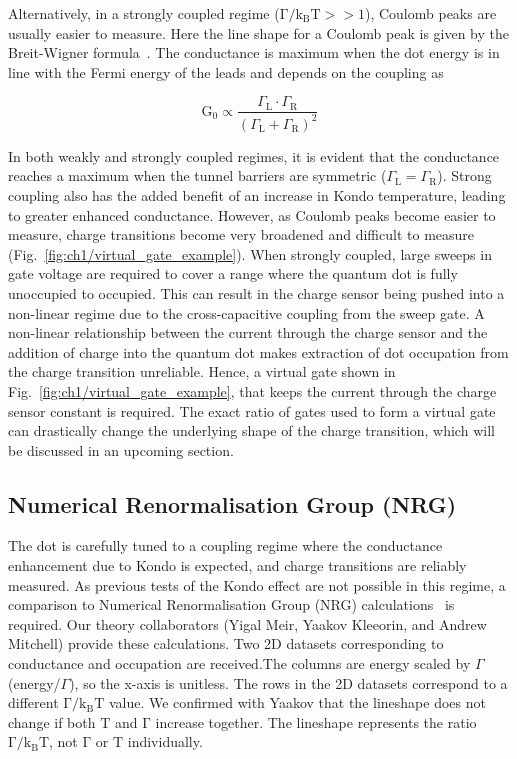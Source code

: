 Alternatively, in a strongly coupled regime ($\mathrm{\Gamma/k_BT}>>1$), Coulomb peaks are usually easier to measure. Here the line shape for a Coulomb peak is given by the Breit-Wigner formula~\cite{Breit1936}. The conductance is maximum when the dot energy is in line with the Fermi energy of the leads and depends on the coupling as 

\begin{equation}\label{eq:cond_amp_strong}
 \mathrm{G_0} \propto
 \frac{\Gamma_\mathrm{L}\cdot\Gamma_\mathrm{R}}{\left(\Gamma_\mathrm{L}+\Gamma_\mathrm{R}\right)^2}
\end{equation}

\noindent In both weakly and strongly coupled regimes, it is evident that the conductance reaches a maximum when the tunnel barriers are symmetric ($\Gamma_\mathrm{L}=\Gamma_\mathrm{R}$). Strong coupling also has the added benefit of an increase in Kondo temperature, leading to greater enhanced conductance. 
However, as Coulomb peaks become easier to measure, charge transitions become very broadened and difficult to measure (Fig.~\ref{fig:ch1/virtual_gate_example}). When strongly coupled, large sweeps in gate voltage are required to cover a range where the quantum dot is fully unoccupied to occupied. This can result in the charge sensor being pushed into a non-linear regime due to the cross-capacitive coupling from the sweep gate.
A non-linear relationship between the current through the charge sensor and the addition of charge into the quantum dot makes extraction of dot occupation from the charge transition unreliable. Hence, a virtual gate shown in Fig.~\ref{fig:ch1/virtual_gate_example}, that keeps the current through the charge sensor constant is required. The exact ratio of gates used to form a virtual gate can drastically change the underlying shape of the charge transition, which will be discussed in an upcoming section. 


\subsection{Numerical Renormalisation Group (NRG)}
The dot is carefully tuned to a coupling regime where the conductance enhancement due to Kondo is expected, and charge transitions are reliably measured. As previous tests of the Kondo effect are not possible in this regime, a comparison to Numerical Renormalisation Group (NRG) calculations~\cite{nrg} is required. Our theory collaborators (Yigal Meir, Yaakov Kleeorin, and Andrew Mitchell) provide these calculations. 
Two 2D datasets corresponding to conductance and occupation are received.The columns are energy scaled by $\Gamma$ (energy/$\Gamma$), so the x-axis is unitless. The rows in the 2D datasets correspond to a different $\mathrm{\Gamma/k_BT}$ value. We confirmed with Yaakov that the lineshape does not change if both $\mathrm{T}$ and $\mathrm{\Gamma}$ increase together. The lineshape represents the ratio $\mathrm{\Gamma/k_BT}$, not $\mathrm{\Gamma}$ or $\mathrm{T}$ individually.

